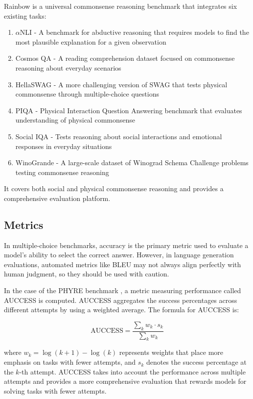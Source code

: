 Rainbow \citep{Lourie2021} is a universal commonsense reasoning benchmark that integrates six existing tasks:
\begin{enumerate}
    \item $\alpha$NLI \citep{Bhagavatula2019} - A benchmark for abductive reasoning that requires models to find the most plausible explanation for a given observation
    \item Cosmos QA \citep{Huang2019} - A reading comprehension dataset focused on commonsense reasoning about everyday scenarios
    \item HellaSWAG \citep{Zellers2019} - A more challenging version of SWAG that tests physical commonsense through multiple-choice questions
    \item PIQA \citep{Bisk2020} - Physical Interaction Question Answering benchmark that evaluates understanding of physical commonsense
    \item Social IQA \citep{Sap2019} - Tests reasoning about social interactions and emotional responses in everyday situations
    \item WinoGrande \citep{Sakaguchi2021} - A large-scale dataset of Winograd Schema Challenge problems testing commonsense reasoning
\end{enumerate}
It covers both social and physical commonsense reasoning and provides a comprehensive evaluation platform.

\subsection{Metrics}

In multiple-choice benchmarks, accuracy is the primary metric used to evaluate a model's ability to select the correct answer. However, in language generation evaluations, automated metrics like BLEU \citep{Papineni2002} may not always align perfectly with human judgment, so they should be used with caution.

In the case of the PHYRE benchmark \citep{Bakhtin2019}, a metric measuring performance called AUCCESS is computed. AUCCESS aggregates the success percentages across different attempts by using a weighted average. The formula for AUCCESS is:

\begin{equation}
    \text{AUCCESS} = \frac{\sum_k w_k \cdot s_k}{\sum_k w_k}
\end{equation}

where $w_k = \log(k+1) - \log(k)$ represents weights that place more emphasis on tasks with fewer attempts, and $s_k$ denotes the success percentage at the $k$-th attempt. AUCCESS takes into account the performance across multiple attempts and provides a more comprehensive evaluation that rewards models for solving tasks with fewer attempts.
